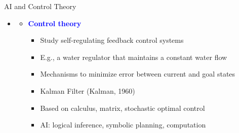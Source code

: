 \documentclass[
  10pt,
  ignorenonframetext,
]{beamer}
\providecommand{\tightlist}{%
  \setlength{\itemsep}{0pt}\setlength{\parskip}{0pt}}
\begin{document}
\begin{frame}{AI and Control Theory}
\label{ai-and-control-theory}
\begin{itemize}
\tightlist
\item
  \textbf{\textcolor{red}{\textcolor{black}{}}}

  \begin{itemize}
  \tightlist
  \item
    \textbf{\textcolor{blue}{Control theory}}

    \begin{itemize}
    \tightlist
    \item
      Study self-regulating feedback control systems
    \item
      E.g., a water regulator that maintains a constant water flow
    \item
      Mechanisms to minimize error between current and goal states
    \item
      Kalman Filter (Kalman, 1960)
    \item
      Based on calculus, matrix, stochastic optimal control
    \item
      AI: logical inference, symbolic planning, computation
    \end{itemize}
  \end{itemize}
\end{itemize}
\end{frame}
\end{document}

